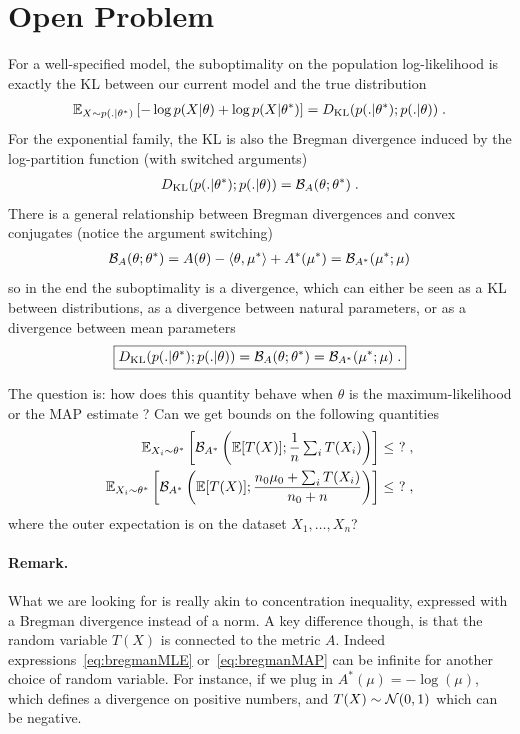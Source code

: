 \documentclass{article}
\newcommand*{\expect}[2][]{\ensuremath{\mathbb{E}_{#1} \left[ #2 \right] }} %
\newcommand{\logpart}{A}
\newcommand{\conj}{\logpart^*}
\newcommand{\bregman}{\cB_\logpart}
\newcommand{\bregmanconj}{\cB_{\logpart^*}}
\newcommand{\natp}{\theta}
\newcommand{\meanp}{\mu}
\begin{document}
\section{Open Problem}
For a well-specified model, the suboptimality on the population log-likelihood is exactly the KL between our current model and the true distribution
\begin{align}
    \expect[X\sim p(.|\natp^*)]{-\log p(X|\natp) + \log p(X|\natp^*) }
	= \KL( p(.|\natp^*) ; p(.|\natp)) \; .
\end{align}
For the exponential family, the KL is also the Bregman divergence induced by the log-partition function (with switched arguments)
\begin{align}
	\KL( p(.|\natp^*) ; p(.|\natp)) 
	= \bregman (\natp ; \natp^*)  \; .
\end{align}
There is a general relationship between Bregman divergences and convex conjugates (notice the argument switching)
\begin{align}
	\bregman (\natp ; \natp^*)
    = \logpart(\natp) - \langle \natp , \mu^* \rangle + \conj(\mu^*)
    = \bregmanconj ( \meanp^* ; \meanp)
\end{align}
so in the end the suboptimality is a divergence, which can either be seen as a KL between distributions, as a divergence between natural parameters, or as a divergence between mean parameters
\begin{align}
\boxed{
	\KL( p(.|\natp^*) ; p(.|\natp))
    = \bregman (\natp ; \natp^*)
    = \bregmanconj ( \meanp^* ; \meanp) \; .
}
\end{align}
\begin{important}
The question is: how does this quantity behave when $\natp$ is the maximum-likelihood or the MAP estimate ? Can we get bounds on the following quantities
\begin{align}
	\label{eq:bregmanMLE}
	\expect[X_i\sim \natp^*]{\bregmanconj \left (\E [T(X)] ;  \inv{n}  \smallsum_i T(X_i) \right )} \leq \ ? \; , \\
	\label{eq:bregmanMAP}
	\expect[X_i\sim \natp^*]{\bregmanconj \left (\E [T(X)] ; \frac{n_0 \mu_0 + \smallsum_i T(X_i)}{n_0+n} \right )} \leq \ ? \; ,
\end{align}
where the outer expectation is on the dataset $X_1, \dots, X_n$?
\end{important}

\paragraph{Remark.}
What we are looking for is really akin to concentration inequality, expressed with a Bregman divergence instead of a norm. A key difference though, is that the random variable $T(X)$ is connected to the metric $\logpart$. Indeed expressions~\eqref{eq:bregmanMLE} or~\eqref{eq:bregmanMAP} can be infinite for another choice of random variable. For instance, if we plug in $\conj(\mu)= -\log(\mu)$, which defines a divergence on positive numbers, and $T(X) \sim {\mathcal N}(0,1)$ which can be negative.
\end{document}
